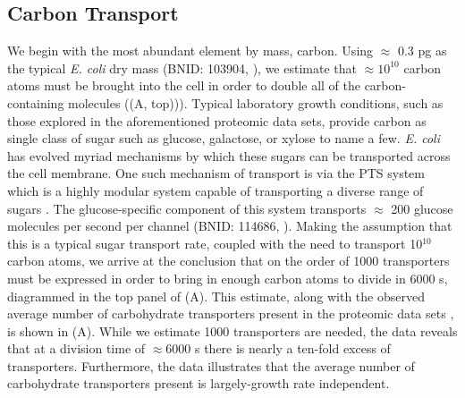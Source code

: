 \subsection{Carbon Transport}
We begin with the most abundant element by mass, carbon. Using $\approx$ 0.3
pg as the typical \textit{E. coli} dry mass (BNID: 103904, \cite{milo2010}),
we estimate that $\approx 10^{10}$ carbon atoms must be brought into the cell
in order to double all of the carbon-containing molecules
((A, top))). Typical laboratory growth conditions, such as
those explored in the aforementioned proteomic data sets, provide carbon as
single class of sugar such as glucose, galactose, or xylose to name a few.
\textit{E. coli} has evolved myriad mechanisms by which these sugars can be
transported across the cell membrane. One such mechanism of transport is via
the PTS system which is a highly modular system capable of transporting a
diverse range of sugars \citep{escalante2012}. The glucose-specific component
of this system transports $\approx$ 200 glucose molecules per second per
channel (BNID: 114686, \cite{milo2010}). Making the assumption that this is a
typical sugar transport rate, coupled with the need to transport 10$^{10}$
carbon atoms, we arrive at the conclusion that on the order of 1000
transporters must be expressed in order to bring in enough carbon atoms to
divide in 6000 s, diagrammed in the top panel of (A). This
estimate, along with the observed average number of carbohydrate transporters
present in the proteomic data sets \citep{schmidt2016,
peebo2015,valgepea2013,li2014}, is shown in (A). While we
estimate 1000 transporters are needed, the data reveals that at a division
time of $\approx 6000$ s there is nearly a ten-fold excess of transporters.
Furthermore, the data illustrates that the average number of carbohydrate
transporters present is largely-growth rate independent.

